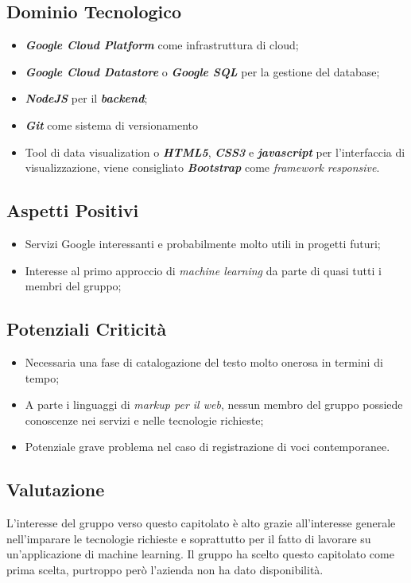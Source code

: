 \subsection{Dominio Tecnologico}
\begin{itemize}
	\item \textit{\textbf{Google Cloud Platform}} come infrastruttura di cloud;
	\item \textbf{\textit{Google Cloud Datastore}} o \textbf{\textit{Google SQL}} per la gestione del database;
	\item \textbf{\textit{NodeJS}} per il \textbf{\textit{backend}};
	\item \textbf{\textit{Git}} come sistema di versionamento
	\item Tool di data visualization o \textbf{\textit{HTML5}}, \textbf{\textit{CSS3}} e \textbf{\textit{javascript}} per l'interfaccia di visualizzazione, viene consigliato \textbf{\textit{Bootstrap}} come \textit{framework} \textit{responsive}.
\end{itemize}

\subsection{Aspetti Positivi}
\begin{itemize}
	\item Servizi Google interessanti e probabilmente molto utili in progetti futuri;
	\item Interesse al primo approccio di \textit{machine learning} da parte di quasi tutti i membri del gruppo;
\end{itemize}

\subsection{Potenziali Criticità}
\begin{itemize}
	\item Necessaria una fase di catalogazione del testo molto onerosa in termini di tempo;
	\item A parte i linguaggi di \textit{markup per il web}, nessun membro del gruppo possiede conoscenze nei servizi e nelle tecnologie richieste;
	\item Potenziale grave problema nel caso di registrazione di voci contemporanee.
\end{itemize}

\subsection{Valutazione}
L'interesse del gruppo verso questo capitolato è alto grazie all'interesse generale nell'imparare le tecnologie richieste e soprattutto per il fatto di lavorare su un'applicazione di machine learning.
Il gruppo ha scelto questo capitolato come prima scelta, purtroppo però l'azienda non ha dato disponibilità.